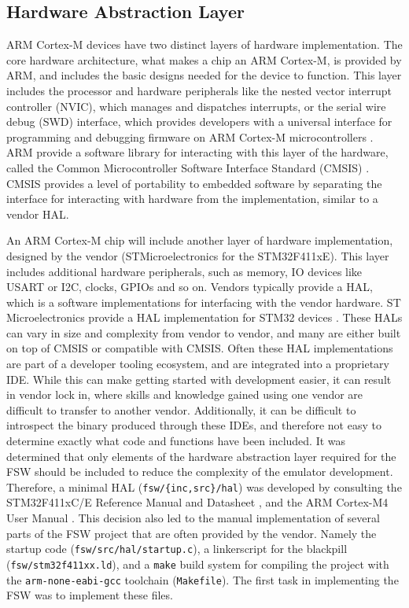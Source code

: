\documentclass[../report.tex]{subfiles}
\begin{document}
\subsection{Hardware Abstraction Layer}

ARM Cortex-M devices have two distinct layers of hardware implementation. The
core hardware architecture, what makes a chip an ARM Cortex-M, is provided by
ARM, and includes the basic designs needed for the device to function. This
layer includes the processor and hardware peripherals like the nested vector
interrupt controller (NVIC), which manages and dispatches interrupts, or the
serial wire debug (SWD) interface, which provides developers with a universal
interface for programming and debugging firmware on ARM Cortex-M
microcontrollers \citep{armcm4_manual}. ARM provide a software library for
interacting with this layer of the hardware, called the Common Microcontroller
Software Interface Standard (CMSIS) \citep{CMSIS}. CMSIS provides a level of portability to
embedded software by separating the interface for interacting with hardware
from the implementation, similar to a vendor HAL.

An ARM Cortex-M chip will include another layer of hardware implementation,
designed by the vendor (STMicroelectronics for the STM32F411xE). This
layer includes additional hardware peripherals, such as memory, IO devices like
USART or I2C, clocks, GPIOs and so on. Vendors typically provide a HAL, which
is a software implementations for interfacing with the vendor hardware. ST
Microelectronics provide a HAL implementation for STM32 devices
\citep{stm32hal}. These HALs can vary in size and complexity from vendor to
vendor, and many are either built on top of CMSIS or compatible with CMSIS.
Often these HAL implementations are part of a developer tooling ecosystem, and
are integrated into a proprietary IDE. While this can make getting started
with development easier, it can result in vendor lock in, where skills and
knowledge gained using one vendor are difficult to transfer to another vendor.
Additionally, it can be difficult to introspect the binary produced through
these IDEs, and therefore not easy to determine exactly what code and functions
have been included. It was determined that only elements of the hardware
abstraction layer required for the FSW should be included to reduce the
complexity of the emulator development. Therefore, a minimal HAL
(\lstinline|fsw/{inc,src}/hal|) was developed by consulting the STM32F411xC/E
Reference Manual and Datasheet \citep{stm32f4_manual, stm32f4_datasheet}, and
the ARM Cortex-M4 User Manual \citep{armcm4_manual}. This decision also led to
the manual implementation of several parts of the FSW project that are often
provided by the vendor. Namely the startup code
(\lstinline|fsw/src/hal/startup.c|), a linkerscript for the blackpill
(\lstinline|fsw/stm32f411xx.ld|), and a \lstinline|make| build system for
compiling the project with the \lstinline|arm-none-eabi-gcc| toolchain
(\lstinline|Makefile|). The first task in implementing the FSW was to implement
these files.
\end{document}
